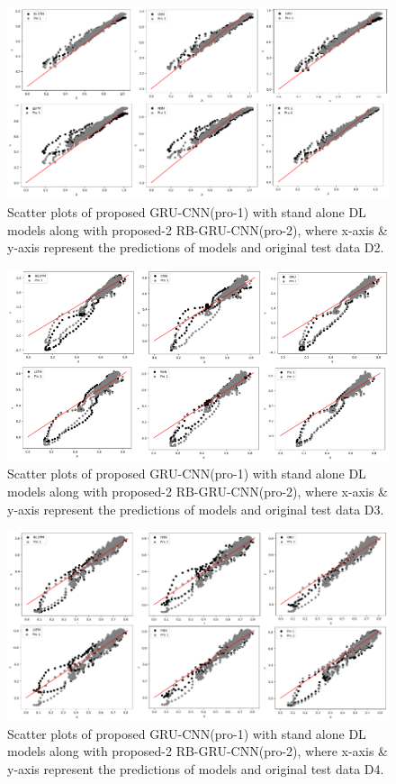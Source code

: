 \documentclass[a4paper, fleqn]{cas-sc}
\begin{document}
   \begin{figure}[h!]
    \centering
     \includegraphics[scale=.5]{d2_sp.drawio.png}
     \caption{Scatter plots of proposed GRU-CNN(pro-1) with stand alone DL models along with proposed-2 RB-GRU-CNN(pro-2), where x-axis \& y-axis represent the predictions of models and original test data D2.}
     \label{Fig:7}
  \end{figure}
  \begin{figure}[h!]
     \centering
     \includegraphics[scale=.5]{d3_sp.drawio.png}
     \caption{Scatter plots of proposed GRU-CNN(pro-1) with stand alone DL models along with proposed-2 RB-GRU-CNN(pro-2), where x-axis \& y-axis represent the predictions of models and original test data D3.}
     \label{Fig:8}
   \end{figure}
   \begin{figure}[h!]
    \centering
     \includegraphics[scale=.5]{d4_sp.drawio.png}
     \caption{Scatter plots of proposed GRU-CNN(pro-1) with stand alone DL models along with proposed-2 RB-GRU-CNN(pro-2), where x-axis \& y-axis represent the predictions of models and original test data D4.}
     \label{Fig:9}
   \end{figure}
\end{document}
